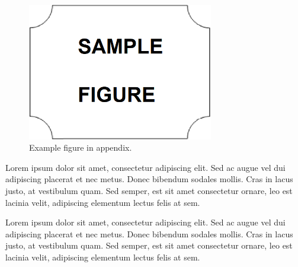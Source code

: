 \begin{figure}[!ht]
    \centering
    \includegraphics[width=230pt,keepaspectratio=true]{./fig/sekil7}
    \caption{Example figure in appendix.}
    \label{fig:appendix}
\end{figure}
\vspace{-3pt}

Lorem ipsum dolor sit amet, consectetur adipiscing elit. Sed ac augue vel dui 
adipiscing placerat et nec metus. Donec bibendum sodales mollis. Cras in lacus 
justo, at vestibulum quam. Sed semper, est sit amet consectetur ornare, leo est 
lacinia velit, adipiscing elementum lectus felis at sem.

Lorem ipsum dolor sit amet, consectetur adipiscing elit. Sed ac augue vel dui 
adipiscing placerat et nec metus. Donec bibendum sodales mollis. Cras in lacus 
justo, at vestibulum quam. Sed semper, est sit amet consectetur ornare, leo est 
lacinia velit, adipiscing elementum lectus felis at sem.




